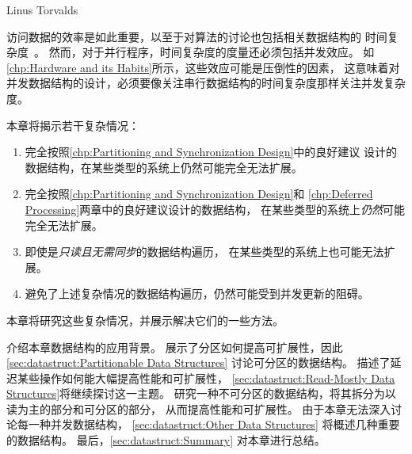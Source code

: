
%
	 {Linus Torvalds}

访问数据的效率是如此重要，以至于对算法的讨论也包括相关数据结构的
时间复杂度~\cite{ThomasHCorman2001Algorithms}。
然而，对于并行程序，时间复杂度的度量还必须包括并发效应。
如\cref{chp:Hardware and its Habits}所示，这些效应可能是压倒性的因素，
这意味着对并发数据结构的设计，必须要像关注串行数据结构的时间复杂度那样关注并发复杂度。

本章将揭示若干复杂情况：

\begin{enumerate}
\item	完全按照\cref{chp:Partitioning and Synchronization Design}中的良好建议
	设计的数据结构，在某些类型的系统上仍然可能完全无法扩展。
\label{sec:datastruct:NUMA-induced failure to scale}
\item	完全按照\cref{chp:Partitioning and Synchronization Design}和
	\cref{chp:Deferred Processing}两章中的良好建议设计的数据结构，
	在某些类型的系统上\emph{仍然}可能完全无法扩展。
\label{sec:datastruct:Cache-size-induced failure to scale}
\item	即使是\emph{只读且无需同步}的数据结构遍历，
	在某些类型的系统上也可能无法扩展。
\label{sec:datastruct:Cache-size-induced failure to scale redux}
\item	避免了上述复杂情况的数据结构遍历，仍然可能受到并发更新的阻碍。
\label{sec:datastruct:Update-activity failure to scale}
\end{enumerate}

本章将研究这些复杂情况，并展示解决它们的一些方法。

介绍本章数据结构的应用背景。
展示了分区如何提高可扩展性，因此
\cref{sec:datastruct:Partitionable Data Structures}
讨论可分区的数据结构。
描述了延迟某些操作如何能大幅提高性能和可扩展性，
\cref{sec:datastruct:Read-Mostly Data Structures}将继续探讨这一主题。
研究一种不可分区的数据结构，将其拆分为以读为主的部分和可分区的部分，
从而提高性能和可扩展性。
由于本章无法深入讨论每一种并发数据结构，
\cref{sec:datastruct:Other Data Structures}
将概述几种重要的数据结构。
最后，\cref{sec:datastruct:Summary}
对本章进行总结。

